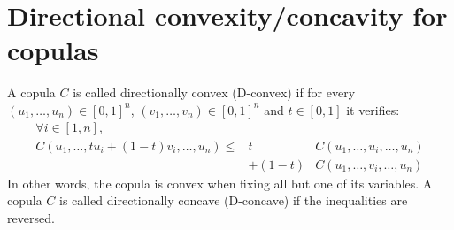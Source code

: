 \section{Directional convexity/concavity for copulas}\label{sec:dconvexity}
\begin{definition}\label{def:convex}
    A copula $C$ is called directionally convex (D-convex) \cite{alvoni_dierent_2007} if for every $(u_1,\dots,u_n)\in[0,1]^n$, $(v_1, \dots, v_n)\in[0,1]^n$ and $t\in[0,1]$ it verifies:
    \begin{eqnarray}
        \forall i\in[1,n],&&\nonumber\\
        C(u_1,\dots, tu_i+(1-t)v_i,\dots, u_n) \leqslant& t&C(u_1,\dots, u_i,\dots, u_n)\nonumber\\
        &+ (1-t)&C(u_1,\dots, v_i,\dots, u_n)\label{eq:convex_copula}
    \end{eqnarray}
    In other words, the copula is convex when fixing all but one of its variables. A copula $C$ is called directionally concave (D-concave) if the inequalities are reversed.
\end{definition}

